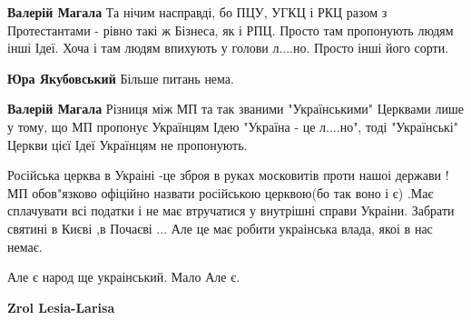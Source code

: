 \begin{itemize}
\begin{itemize}
 
\textbf{Валерій Магала} Та нічим насправді, бо ПЦУ, УГКЦ і РКЦ разом з
Протестантами - рівно такі ж Бізнеса, як і РПЦ. Просто там пропонують людям
інші Ідеї. Хоча і там людям впихують у голови л....но. Просто інші його сорти.

 
\textbf{Юра Якубовський} Більше питань нема.

 
\textbf{Валерій Магала} Різниця між МП та так званими "Українськими" Церквами
лише у тому, що МП пропонує Українцям Ідею "Україна - це л....но", тоді
"Українські" Церкви цієї Ідеї Українцям не пропонують.

 

Російська церква в Украіні -це зброя в руках московитів проти нашоі держави !
МП обов"язково офіційно назвати російською церквою(бо так воно і є) .Має
сплачувати всі податки і не має втручатися у внутрішні справи Украіни. Забрати
святині в Києві ,в Почаєві ... Але це має робити украінська влада, якоі в нас
немає.

Але є народ ще украінський. Мало Але є.

 
\textbf{Zrol Lesia-Larisa} 


\end{itemize}
\end{itemize}
